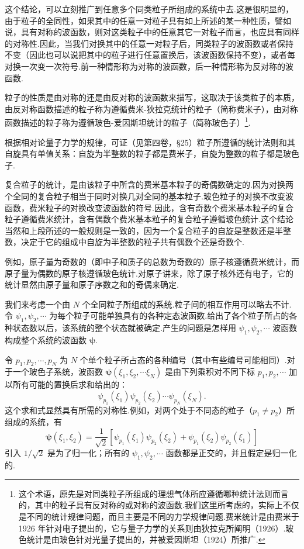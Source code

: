 这个结论，可以立刻推广到任意多个同类粒子所组成的系统中去.这是很明显的，由于粒子的全同性，如果其中的任意一对粒子具有如上所述的某一种性质，譬如说，具有对称的波函数，则对这类粒子中的任意其它一对粒子而言，也应具有同样的对称性.因此，当我们对换其中的任意一对粒子后，同类粒子的波函数或者保持不变（因此也可以说把其中的粒子进行任意置换后，该波函数保持不变），或者每对换一次变一次符号.前一种情形称为对称的波函数，后一种情形称为反对称的波函数.

粒子的性质是由对称的还是由反对称的波函数来描写，这取决于该类粒子的本质，由反对称函数描述的粒子称为遵循费米-狄拉克统计的粒子（简称费米子），由对称函数描述的粒子称为遵循玻色-爱因斯坦统计的粒子（简称玻色子）\footnote{这个术语，原先是对同类粒子所组成的理想气体所应遵循哪种统计法则而言的，其中的粒子具有反对称的或对称的波函数.我们这里所考虑的，实际上不仅是不同的统计规律问题，而且主要是不同的力学规律问题.费米统计是由费米于 1926 年针对电子提出的，它与量子力学的关系则由狄拉克所阐明（1926）.玻色统计是由玻色针对光量子提出的，并被爱因斯坦（1924）所推广.}.

根据相对论量子力学的规律，可证（见第四卷，§25）粒子所遵循的统计法则和其自旋具有单值关系：自旋为半整数的粒子都是费米子，自旋为整数的粒子都是玻色子.

复合粒子的统计，是由该粒子中所含的费米基本粒子的奇偶数确定的.因为对换两个全同的复合粒子相当于同时对换几对全同的基本粒子.玻色粒子的对换不改变波函数，费米粒子的对换改变波函数的符号.因此，含有奇数个费米基本粒子的复合粒子遵循费米统计，含有偶数个费米基本粒子的复合粒子遵循玻色统计.这个结论当然和上段所述的一般规则是一致的，因为一个复合粒子的自旋是整数还是半整数，决定于它的组成中自旋为半整数的粒子共有偶数个还是奇数个.

例如，原子量为奇数的（即中子和质子的总数为奇数的）原子核遵循费米统计，而原子量为偶数的原子核遵循玻色统计.对原子讲来，除了原子核外还有电子，它的统计显然由原子量和原子序数之和的奇偶来确定.

我们来考虑一个由 $N$ 个全同粒子所组成的系统.粒子间的相互作用可以略去不计.令 $\psi_1,\psi_2,\cdots$ 为每个粒子可能单独具有的各种定态波函数.给出了各个粒子所占的各种状态数以后，该系统的整个状态就被确定.产生的问题是怎样用 $\psi_1,\psi_2,\cdots$ 波函数构成整个系统的波函数 $\boldsymbol{\psi}$.

令 $p_1,p_2,\cdots,p_N$ 为 $N$ 个单个粒子所占态的各种编号（其中有些编号可能相同）.对于一个玻色子系统，波函数 $\boldsymbol{\psi}(\xi_1,\xi_2,\cdots\xi_N)$ 是由下列乘积对不同下标 $p_1,p_2,\cdots$ 加以所有可能的置换后求和给出的：
\begin{equation}
  \psi_{p_1}(\xi_1)\psi_{p_2}(\xi_2)\cdots\psi_{p_N}(\xi_N).
\end{equation}
这个求和式显然具有所需的对称性.例如，对两个处于不同态的粒子（$p_1\neq p_2$）所组成的系统，有
\begin{equation}
  \boldsymbol{\psi}(\xi_1,\xi_2)=\frac{1}{\sqrt{2}}\left[\psi_{p_1}(\xi_1)\psi_{p_2}(\xi_2)+\psi_{p_1}(\xi_2)\psi_{p_2}(\xi_1)\right]
\end{equation}
引入 $1/\sqrt{2}$ 是为了归一化；所有的 $\psi_1,\psi_2,\cdots$ 函数都是正交的，并且假定是归一化的.

